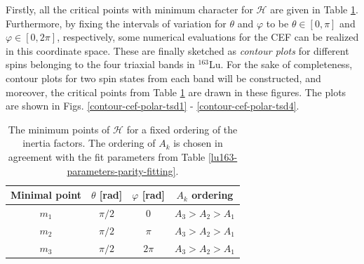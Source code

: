 Firstly, all the critical points with minimum character for $\mathcal{H}$ are given in Table \ref{critical_points_h}. Furthermore, by fixing the intervals of variation for $\theta$ and $\varphi$ to be $\theta\in[0,\pi]$ and $\varphi\in[0,2\pi]$, respectively, some numerical evaluations for the CEF can be realized in this coordinate space. These are finally sketched as \emph{contour plots} for different spins belonging to the four triaxial bands in $^{163}$Lu. For the sake of completeness, contour plots for two spin states from each band will be constructed, and moreover, the critical points from Table \ref{critical_points_h} are drawn in these figures. The plots are shown in Figs. \ref{contour-cef-polar-tsd1} - \ref{contour-cef-polar-tsd4}.
\begin{table}
    \centering
    \begin{tabular}{cccc}
    \hline
    Minimal point & $\theta$ [rad] & $\varphi$ [rad] & $A_k$ ordering \\
    \hline
    \hline
    $m_1$ & $\pi/2$ &   $0$     &   $A_3>A_2>A_1$   \\
    $m_2$ & $\pi/2$ &   $\pi$   &   $A_3>A_2>A_1$   \\
    $m_3$ & $\pi/2$ &   $2\pi$  &   $A_3>A_2>A_1$   \\
    \hline
    \end{tabular}
    \caption{The minimum points of $\mathcal{H}$ for a fixed ordering of the inertia factors. The ordering of $A_k$ is chosen in agreement with the fit parameters from Table \ref{lu163-parameters-parity-fitting}.}
    \label{critical_points_h}
\end{table}
